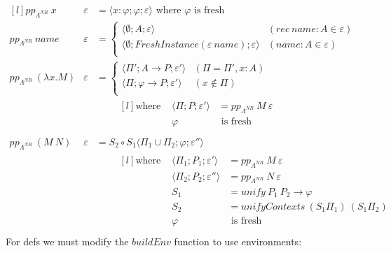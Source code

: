 \[\begin{matrix*}[l]
    pp_{\Lambda^{NR}} \ x & \varepsilon & = \langle x: \varphi ; \varphi ; \varepsilon \rangle \text{ where } \varphi \text{ is fresh} \\

    pp_{\Lambda^{NR}} \ name & \varepsilon & = \begin{cases}
        \langle \emptyset ; A ; \varepsilon \rangle & (rec \ name : A \in \varepsilon ) \\
        \langle \emptyset ; FreshInstance(\varepsilon \ name) ; \varepsilon  \rangle & (name : A \in \varepsilon) \\
    \end{cases} \\
    pp_{\Lambda^{NR}} \ (\lambda x . M) & \varepsilon & = \begin{cases}
        \langle \Pi'; A \to P ; \varepsilon' \rangle & (\Pi = \Pi', x:A) \\
        \langle \Pi; \varphi \to P ; \varepsilon' \rangle & (x \not\in \Pi) \\
    \end{cases} \\
    & & \qquad \begin{matrix*}[l]
        \text{where } & \langle \Pi; P ; \varepsilon' \rangle & = pp_{\Lambda^{NR}} \ M \ \varepsilon \\
        & \varphi & \text{ is fresh} \\
    \end{matrix*} \\
    pp_{\Lambda^{NR}} \ (M \ N) & \varepsilon & = S_2 \circ S_1 \langle \Pi_1 \cup \Pi_2 ; \varphi ; \varepsilon'' \rangle \\
    & & \qquad \begin{matrix*}[l]
        \text{where } & \langle \Pi_1 ; P_1 ; \varepsilon' \rangle & = pp_{\Lambda^{NR}} \ M \ \varepsilon \\
        & \langle \Pi_2 ; P_2 ; \varepsilon'' \rangle & = pp_{\Lambda^{NR}} \ N \ \varepsilon \\
        & S_1 & = unify \ P_1 \ P_2 \to \varphi \\
        & S_2 & = unifyContexts \ (S_1 \Pi_1) \ (S_1 \Pi_2) \\
        & \varphi & \text{ is fresh} \\
    \end{matrix*}
\end{matrix*}\]
For defs we must modify the $buildEnv$ function to use environments:
